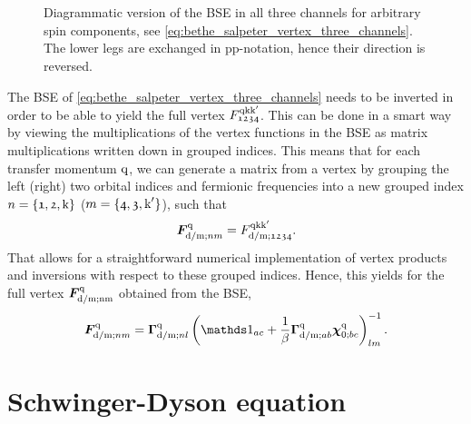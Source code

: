 \documentclass[../../main.tex]{subfiles}
\begin{document}
\begin{figure}[ht!]
  \centering
  \parbox{\textwidth}{
    \subfloat{}
  }\\[1cm]
  \parbox{\textwidth}{
    \subfloat{}
  }\\[1cm]
  \parbox{\textwidth}{
    \subfloat{}
  }
  \caption{Diagrammatic version of the BSE in all three channels for arbitrary spin components, see \eqref{eq:bethe_salpeter_vertex_three_channels}. The lower legs are exchanged in pp-notation, hence their direction is reversed.}
  \label{fig:bethe_salpeter_diagrammatic}
\end{figure}

The BSE of \eqref{eq:bethe_salpeter_vertex_three_channels} needs to be inverted in order to be able to yield the full vertex $F_{\mathfrak{1234}}^{\text{q}\text{k}\text{k}'}$. This can be done in a smart way by viewing the multiplications of the vertex functions in the BSE as matrix multiplications written down in grouped indices. This means that for each transfer momentum $\text{q}$, we can generate a matrix from a vertex by grouping the left (right) two orbital indices and fermionic frequencies into a new grouped index $n=\{\mathfrak{1}, \mathfrak{2}, \text{k}\}$ ($m=\{\mathfrak{4}, \mathfrak{3}, \text{k}'\}$), such that \cite{Galler2017} 
\begin{align}
	\bm{F}^{\text{q}}_{\text{d}/\text{m};nm}=F^{\text{q}\text{k}\text{k}'}_{\text{d}/\text{m};\mathfrak{1234}}.
\end{align}
That allows for a straightforward numerical implementation of vertex products and inversions with respect to these grouped indices. Hence, this yields for the full vertex $\bm{F}^{\text{q}}_{\text{d}/\text{m};\text{nm}}$ obtained from the BSE,
\begin{align}
	\bm{F}^{\q}_{\dens/\magn;nm}=\bm{\Gamma}^{\q}_{\dens/\magn;nl}\left (\unity_{ac} +\frac1\beta \bm{\Gamma}^{\q}_{\dens/\magn;ab}\bm{\chi}^{\q}_{0;bc}\right )^{-1}_{lm}.
\end{align}

\section{Schwinger-Dyson equation}\label{sec:schwinger_dyson}
\end{document}
